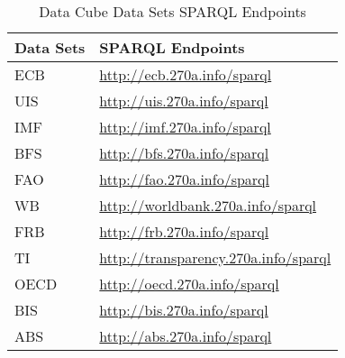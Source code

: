 \documentclass{llncs}
\begin{document}
\begin{table}[H]
	\centering
		\begin{tabular}{l|l}
      \textbf{Data Sets} & \textbf{SPARQL Endpoints} \\		
      \hline
      ECB & \url{http://ecb.270a.info/sparql} \\
			UIS & \url{http://uis.270a.info/sparql} \\
			IMF & \url{http://imf.270a.info/sparql} \\
			BFS & \url{http://bfs.270a.info/sparql} \\
			FAO & \url{http://fao.270a.info/sparql} \\
			WB & \url{http://worldbank.270a.info/sparql} \\
			FRB & \url{http://frb.270a.info/sparql} \\
			TI & \url{http://transparency.270a.info/sparql} \\
			OECD & \url{http://oecd.270a.info/sparql} \\
			BIS & \url{http://bis.270a.info/sparql} \\
			ABS & \url{http://abs.270a.info/sparql} \\
		\end{tabular}
	\caption{Data Cube Data Sets SPARQL Endpoints}
	\label{tab:data-cube-data-sets-sparql-endpoints}
\end{table}
\end{document}
